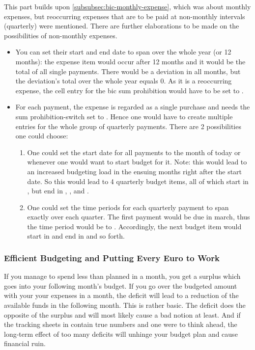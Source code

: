 This part builds upon \autoref{subsubsec:bic-monthly-expense}, which was about monthly expenses, but reoccurring expenses that are to be paid at non-monthly intervals (\eg quarterly) were mentioned.
There are further elaborations to be made on the possibilities of non-monthly expenses.
\begin{itemize}
	\item You can set their start and end date to span over the whole year (or 12 months): the expense item would occur after 12 months and it would be the total of all single payments.
	There would be a deviation in all months, but the deviation's total over the whole year equals 0.
	As it is a reoccurring expense, the cell entry for the \ac{bic} sum prohibition would have to be set to .
	\item For each payment, \ie the expense is regarded as a single purchase and needs the sum prohibition-switch set to .
	Hence one would have to create multiple entries for the whole group of quarterly payments.
	There are 2 possibilities one could choose:
	\begin{enumerate}
		\item One could set the start date for all payments to the month of today or whenever one would want to start budget for it.
		Note: this would lead to an increased budgeting load in the ensuing months right after the start date.
		So this would lead to 4 quarterly budget items, all of which start in , but end in , ,  and .
		\item One could set the time periods for each quarterly payment to span exactly over each quarter.
		The first payment would be due in march, thus the time period would be  to .
		Accordingly, the next budget item would start in  and end in  and so forth.
	\end{enumerate}
\end{itemize}

\subsubsection{Efficient Budgeting and Putting Every Euro to Work}
\label{subsubsec:efficient-budgeting}

If you manage to spend less than planned in a month, you get a surplus which goes into your following month's budget.
If you go over the budgeted amount with your your expenses in a month, the deficit will lead to a reduction of the available funds in the following month.
This is rather basic.
The deficit does the opposite of the surplus and will most likely cause a bad notion at least.
And if the tracking sheets in \tfn contain true numbers and one were to think ahead, the long-term effect of too many deficits will unhinge your budget plan and cause financial ruin.

